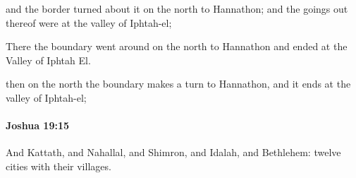 			\begin{versebox}
					\item[BHS] 
					\item[ASV] and the border turned about it on the north to Hannathon; and the goings out thereof were at the valley of Iphtah-el;
					\item[NIV] There the boundary went around on the north to Hannathon and ended at the Valley of Iphtah El.
					\item[NRSV] then on the north the boundary makes a turn to Hannathon, and it ends at the valley of Iphtah-el;
			\end{versebox}

		\paragraph{Joshua 19:15} %
			\label{JOSHUA-19-15}

			And Kattath, and Nahallal, and Shimron, and Idalah, and Bethlehem: twelve cities with their villages.

